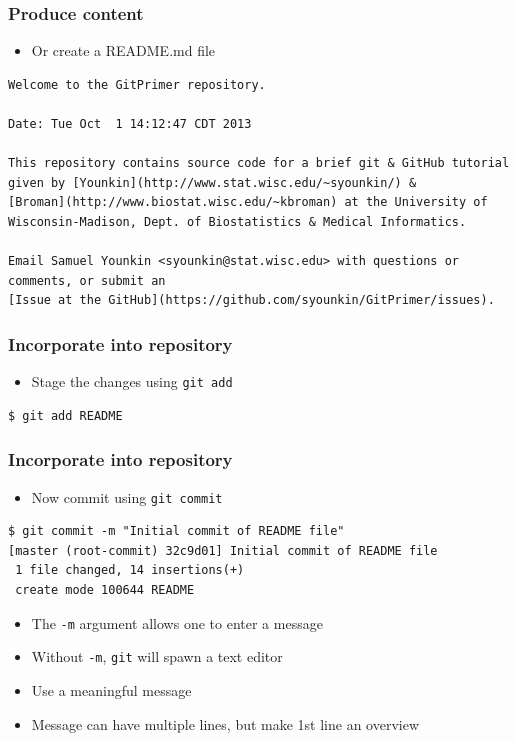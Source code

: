 \documentclass[12pt,t]{beamer}
\newcommand{\bi}{\begin{itemize}}
\newcommand{\bbi}{\vspace{24pt} \begin{itemize} \itemsep8pt}
\newcommand{\ei}{\end{itemize}}
\begin{document}
\begin{frame}[fragile]
\frametitle{Produce content}
\bbi
\item Or create a README.md file
\ei
\begin{semiverbatim}
\begin{lstlisting}
Welcome to the GitPrimer repository.

Date: Tue Oct  1 14:12:47 CDT 2013

This repository contains source code for a brief git & GitHub tutorial
given by [Younkin](http://www.stat.wisc.edu/~syounkin/) &
[Broman](http://www.biostat.wisc.edu/~kbroman) at the University of
Wisconsin-Madison, Dept. of Biostatistics & Medical Informatics.

Email Samuel Younkin <syounkin@stat.wisc.edu> with questions or
comments, or submit an
[Issue at the GitHub](https://github.com/syounkin/GitPrimer/issues).
\end{lstlisting}
\end{semiverbatim}
\end{frame}

\begin{frame}[fragile]
\frametitle{Incorporate into repository}
\bbi
\item Stage the changes using {\tt git add}
\ei
\begin{semiverbatim}
\begin{lstlisting}
$ git add README
\end{lstlisting}
\end{semiverbatim}
\end{frame}

\begin{frame}[fragile]
\frametitle{Incorporate into repository}
\bbi
\item Now commit using {\tt git commit}
\ei
\begin{semiverbatim}
\begin{lstlisting}
$ git commit -m "Initial commit of README file"
[master (root-commit) 32c9d01] Initial commit of README file
 1 file changed, 14 insertions(+)
 create mode 100644 README
\end{lstlisting}
\end{semiverbatim}

\bi
\item The \texttt{-m} argument allows one to enter a message
\item Without \texttt{-m}, \texttt{git} will spawn a text editor
\item Use a meaningful message
\item Message can have multiple lines, but make 1st line an overview
\ei
\end{frame}
\end{document}
